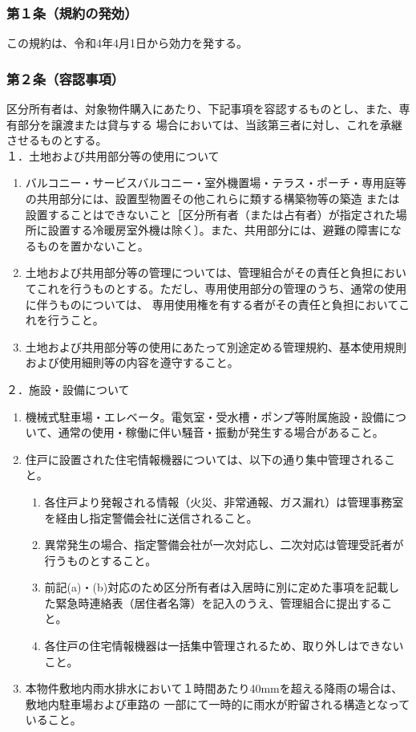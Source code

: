 \documentclass[12pt,uplatex,dvipdfmx]{jsarticle}
\begin{document}
\subsubsection*{第１条（規約の発効）}
この規約は、令和4年4月1日から効力を発する。
\subsubsection*{第２条（容認事項）}
区分所有者は、対象物件購入にあたり、下記事項を容認するものとし、また、専有部分を譲渡または貸与する
場合においては、当該第三者に対し、これを承継させるものとする。\\
１．土地および共用部分等の使用について
\begin{enumerate}
\item バルコニー・サービスバルコニー・室外機置場・テラス・ポーチ・専用庭等の共用部分には、設置型物置その他これらに類する構築物等の築造
または設置することはできないこと［区分所有者（または占有者）が指定された場所に設置する冷暖房室外機は除く〕。また、共用部分には、避難の障害になるものを置かないこと。
\item 土地および共用部分等の管理については、管理組合がその責任と負担においてこれを行うものとする。ただし、専用使用部分の管理のうち、通常の使用に伴うものについては、
      専用使用権を有する者がその責任と負担においてこれを行うこと。
\item 土地および共用部分等の使用にあたって別途定める管理規約、基本使用規則および使用細則等の内容を遵守すること。
\end{enumerate}
２．施設・設備について
\begin{enumerate}
\item 機械式駐車場・エレベータ。電気室・受水槽・ポンプ等附属施設・設備について、通常の使用・稼働に伴い騒音・振動が発生する場合があること。
\item 住戸に設置された住宅情報機器については、以下の通り集中管理されること。
\begin{enumerate}
      \item 各住戸より発報される情報（火災、非常通報、ガス漏れ）は管理事務室を経由し指定警備会社に送信されること。
      \item 異常発生の場合、指定警備会社が一次対応し、二次対応は管理受託者が行うものとすること。
      \item 前記(a)・(b)対応のため区分所有者は入居時に別に定めた事項を記載した緊急時連絡表（居住者名簿）を記入のうえ、管理組合に提出すること。
      \item 各住戸の住宅情報機器は一括集中管理されるため、取り外しはできないこと。
\end{enumerate}
\item 本物件敷地内雨水排水において１時間あたり40mmを超える降雨の場合は、敷地内駐車場および車路の
      一部にて一時的に雨水が貯留される構造となっていること。
\end{enumerate}
\end{document}
